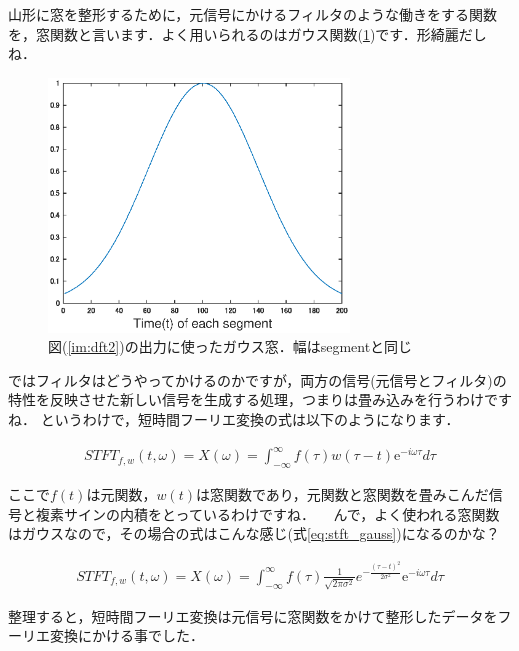 \documentclass[11pt,a4paper]{ujreport} 	%
\begin{document}
山形に窓を整形するために，元信号にかけるフィルタのような働きをする関数を，窓関数と言います．よく用いられるのはガウス関数(\ref{im:gauss-window})です．形綺麗だしね．

\begin{figure}[H]
  \label{im:gauss-window}
  \centering
  \includegraphics[width=8cm]{../figures/gauss-window.eps}
  \caption{図(\ref{im:dft2})の出力に使ったガウス窓．幅はsegmentと同じ}
\end{figure}

ではフィルタはどうやってかけるのかですが，両方の信号(元信号とフィルタ)の特性を反映させた新しい信号を生成する処理，つまりは畳み込みを行うわけですね．
というわけで，短時間フーリエ変換の式は以下のようになります．

\begin{eqnarray}
STFT_{f,w}(t, \omega) =X(\omega)= \int_{-\infty}^{\infty} f(\tau)w(\tau - t)\mathrm{e}^{-i\omega \tau} d\tau
\label{eq:stft}
\end{eqnarray}

ここで$f(t)$は元関数，$w(t)$は窓関数であり，元関数と窓関数を畳みこんだ信号と複素サインの内積をとっているわけですね．
　んで，よく使われる窓関数はガウスなので，その場合の式はこんな感じ(式\ref{eq:stft_gauss})になるのかな？

\begin{eqnarray}
STFT_{f,w}(t, \omega) = X(\omega) = \int_{-\infty}^{\infty} f(\tau) \frac{1}{\sqrt{2\pi\sigma^2}}e^{-\frac{{(\tau-t)}^2}{2\sigma^2}}\mathrm{e}^{-i\omega \tau} d\tau
\label{eq:stft_gauss}
\end{eqnarray}

整理すると，短時間フーリエ変換は元信号に窓関数をかけて整形したデータをフーリエ変換にかける事でした．\\
\end{document}
